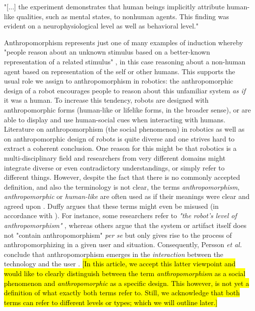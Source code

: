 \documentclass{frontiersSCNS} %
\begin{document}
"[...] the experiment demonstrates that human beings implicitly attribute
human-like qualities, such as mental states, to nonhuman agents. This finding
was evident on a neurophysiological level as well as behavioral level."
\cite{hegel_understanding_2008}


Anthropomorphism represents just one of many examples of induction whereby
"people reason about an unknown stimulus based on a better-known representation
of a related stimulus" \cite{epley_when_2008}, in this case reasoning about a
non-human agent based on representation of the self or other humans. This
supports the usual role we assign to anthropomorphism in robotics: the
anthropomorphic design of a robot encourages people to reason about this
unfamiliar system \emph{as if} it was a human. To increase this tendency, robots
are designed with anthropomorphic forms (human-like or lifelike forms, in the
broader sense), or are able to display and use human-social cues when
interacting with humans.\\

Literature on anthropomorphism (the social phenomenon) in robotics as well as on
anthropomorphic design of robots is quite diverse and one strives hard to
extract a coherent conclusion. One reason for this might be that robotics is a
multi-disciplinary field and researchers from very different domains might
integrate diverse or even contradictory understandings, or simply refer to
different things. However, despite the fact that there is no commonly accepted
definition, and also the terminology is not clear, the terms
\textit{anthropomorphism}, \textit{anthropomorphic} or \textit{human-like} are
often used as if their meanings were clear and agreed upon
\cite{persson_anthropomorphism_2000}. Duffy \cite{duffy_anthropomorphism_2002}
argues that these terms might even be misused (in accordance with
\cite{epley_when_2008}). For instance, some researchers refer to \textit{"the
robot's level of anthropomorphism"} \cite{bartneck_is_2007}, whereas others
argue that the system or artifact itself does not "contain anthropomorphism"
\textit{per se} but only gives rise to the process of anthropomorphizing in a
given user and situation. Consequently, Persson \textit{et al.} conclude that
anthropomorphism emerges in the \textit{interaction} between the technology and
the user \cite{persson_anthropomorphism_2000}.  \hl{[In this article, we accept
this latter viewpoint and would like to clearly distinguish between the term
\textit{anthropomorphism} as a social phenomenon and \textit{anthropomorphic} as
a specific design. This however, is not yet a definition of what exactly both
terms refer to. Still, we acknowledge that both terms can refer to different
levels or types; which we will outline later.]} 
\end{document}
